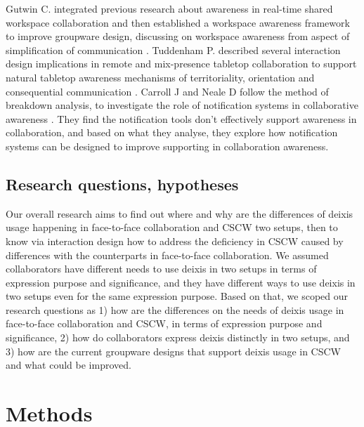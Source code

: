 \documentclass[12pt,twoside]{article}
\begin{document}
Gutwin C. integrated previous research about awareness in real-time shared workspace collaboration and then established a workspace awareness framework to improve groupware design, discussing on workspace awareness from aspect of simplification of communication \cite{gutwin2002descriptive}. Tuddenham P. described several interaction design implications in remote and mix-presence tabletop collaboration to support natural tabletop awareness mechanisms of territoriality, orientation and consequential communication \cite{robinson2007distributed}.
Carroll J and Neale D follow the method of breakdown analysis, to investigate the role of notification systems in collaborative awareness \cite{carroll2003notification}. They find the notification tools don’t effectively support awareness in collaboration, and based on what they analyse, they explore how notification systems can be designed to improve supporting in collaboration awareness.


\subsection{Research questions, hypotheses}
\label{sect:questions}

Our overall research aims to find out where and why are the differences of deixis usage happening in face-to-face collaboration and CSCW two setups, then to know via interaction design how to address the deficiency in CSCW caused by differences with the counterparts in face-to-face collaboration. We assumed collaborators have different needs to use deixis in two setups in terms of expression purpose and significance, and they have different ways to use deixis in two setups even for the same expression purpose. Based on that, we scoped our research questions as 1) how are the differences on the needs of deixis usage in face-to-face collaboration and CSCW, in terms of expression purpose and significance, 2) how do collaborators express deixis distinctly in two setups, and 3) how are the current groupware designs that support deixis usage in CSCW and what could be improved. 


\section{Methods}
\label{sec:method}
\end{document}
